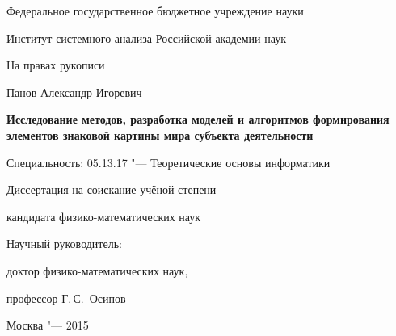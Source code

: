 \thispagestyle{empty}

\begin{center}
Федеральное государственное бюджетное учреждение науки\par
Институт системного анализа Российской академии наук\par 
\par
\end{center}

\vspace{10mm}
\begin{flushright}
На правах рукописи
\end{flushright}

\vspace{15mm}
\begin{center}
{\large Панов Александр Игоревич}
\end{center}

\vspace{5mm}
\begin{center}
{\bfseries\Large Исследование методов, разработка моделей и алгоритмов формирования элементов знаковой картины мира субъекта деятельности
\par}

\vspace{10mm}
{%
Специальность: 05.13.17 "--- Теоретические основы информатики
}

\vspace{5mm}
Диссертация на соискание учёной степени

кандидата физико-математических наук
\end{center}

\vspace{30mm}
\begin{flushright}
Научный руководитель:

доктор физико-математических наук,

профессор Г.\,С.~Осипов

\end{flushright}

\vspace{20mm}
\begin{center}
{Москва "--- 2015}
\end{center}

\newpage